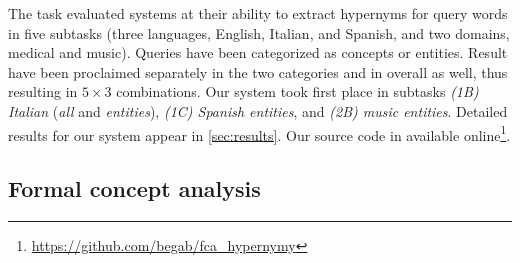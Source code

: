 \documentclass[11pt,a4paper]{article}
\begin{document}
The task \citep{Camacho-Collados:2018} evaluated systems at their ability to
extract hypernyms for query words in five subtasks (three languages, English,
Italian, and Spanish, and two domains, medical and music). Queries have been
categorized as concepts or entities. Result have been proclaimed separately
in the two categories and in overall as well, thus resulting in $5\times 3$
combinations.  
  Our system took first place in subtasks
  \emph{(1B) Italian} (\emph{all} and \emph{entities}),
  \emph{(1C) Spanish entities}, and
  \emph{(2B) music entities}.
Detailed results for our system appear in \autoref{sec:results}.
Our source code in available
online\footnote{\url{https://github.com/begab/fca_hypernymy}}.


\subsection{Formal concept analysis}

\newcommand{\ob}{\ensuremath{\mathcal O}}
\newcommand{\at}{\ensuremath{\mathcal A}}
\newcommand{\inci}{\ensuremath{\mathcal I}}
\newcommand{\oaconc}{\ensuremath{\langle O, A\rangle}}
\end{document}
